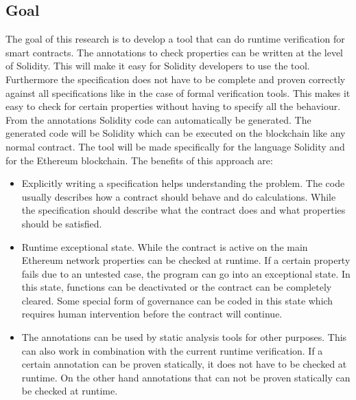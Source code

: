 \documentclass[a4paper]{article}
\begin{document}
\subsection{Goal}
The goal of this research is to develop a tool that can do runtime verification for smart contracts. The annotations to check properties can be written at the level of Solidity. This will make it easy for Solidity developers to use the tool. Furthermore the specification does not have to be complete and proven correctly against all specifications like in the case of formal verification tools. This makes it easy to check for certain properties without having to specify all the behaviour. From the annotations Solidity code can automatically be generated. The generated code will be Solidity which can be executed on the blockchain like any normal contract. The tool will be made specifically for the language Solidity and for the Ethereum blockchain.
The benefits of this approach are:
\begin{itemize}
  \item Explicitly writing a specification helps understanding the problem. The code usually describes how a contract should behave and do calculations. While the specification should describe what the contract does and what properties should be satisfied.
  \item Runtime exceptional state. While the contract is active on the main Ethereum network properties can be checked at runtime. If a certain property fails due to an untested case, the program can go into an exceptional state. In this state, functions can be deactivated or the contract can be completely cleared. Some special form of governance can be coded in this state which requires human intervention before the contract will continue.
  \item The annotations can be used by static analysis tools for other purposes. This can also work in combination with the current runtime verification. If a certain annotation can be proven statically, it does not have to be checked at runtime. On the other hand annotations that can not be proven statically can be checked at runtime.
\end{itemize}
\end{document}

